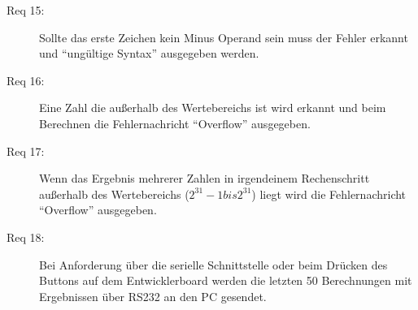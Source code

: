 \begin{description}
\item[Req 15:] Sollte das erste Zeichen kein Minus Operand sein muss der Fehler erkannt und ``ungültige Syntax'' ausgegeben werden.
\item[Req 16:] Eine Zahl die außerhalb des Wertebereichs ist wird erkannt und beim Berechnen die Fehlernachricht ``Overflow'' ausgegeben.
\item[Req 17:] Wenn das Ergebnis mehrerer Zahlen in irgendeinem Rechenschritt außerhalb des Wertebereichs ($2^31 -1 bis 2^31$) liegt wird die
Fehlernachricht ``Overflow'' ausgegeben.
\item[Req 18:] Bei Anforderung über die serielle Schnittstelle oder beim Drücken des Buttons auf dem Entwicklerboard werden die letzten 50 Berechnungen
mit Ergebnissen über RS232 an den PC gesendet.

\end{description}
